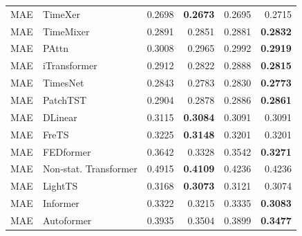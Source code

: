 \begin{longtable}{llrrrr}
\midrule
MAE & TimeXer & 0.2698 & \textbf{0.2673} & 0.2695 & 0.2715 \\
MAE & TimeMixer & 0.2891 & 0.2851 & 0.2881 & \textbf{0.2832} \\
MAE & PAttn & 0.3008 & 0.2965 & 0.2992 & \textbf{0.2919} \\
MAE & iTransformer & 0.2912 & 0.2822 & 0.2888 & \textbf{0.2815} \\
MAE & TimesNet & 0.2843 & 0.2783 & 0.2830 & \textbf{0.2773} \\
MAE & PatchTST & 0.2904 & 0.2878 & 0.2886 & \textbf{0.2861} \\
MAE & DLinear & 0.3115 & \textbf{0.3084} & 0.3091 & 0.3091 \\
MAE & FreTS & 0.3225 & \textbf{0.3148} & 0.3201 & 0.3201 \\
MAE & FEDformer & 0.3642 & 0.3328 & 0.3542 & \textbf{0.3271} \\
MAE & Non-stat. Transformer & 0.4915 & \textbf{0.4109} & 0.4236 & 0.4236 \\
MAE & LightTS & 0.3168 & \textbf{0.3073} & 0.3121 & 0.3074 \\
MAE & Informer & 0.3322 & 0.3215 & 0.3335 & \textbf{0.3083} \\
MAE & Autoformer & 0.3935 & 0.3504 & 0.3899 & \textbf{0.3477} \\
\end{longtable}
\endgroup

